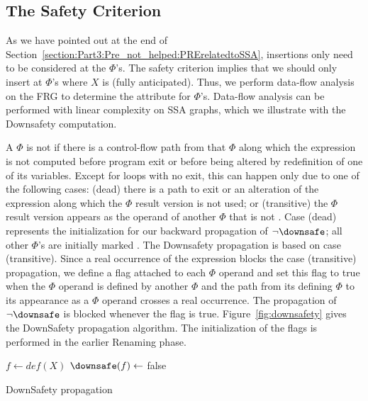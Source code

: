 \subsection{The Safety Criterion}

As we have pointed out at the end of Section~\ref{section:Part3:Pre_not_helped:PRErelatedtoSSA}, insertions only need to be considered at the $\Phi$'s. 
The safety criterion implies that we should only insert at $\Phi$'s where $X$ is \downsafe (fully anticipated). 
Thus, we perform data-flow analysis on the FRG to determine the \downsafe attribute for $\Phi$'s. 
Data-flow analysis can be performed with linear complexity on SSA graphs, which we illustrate with the Downsafety computation.

A $\Phi$ is not \downsafe{} if there is a control-flow path from that $\Phi$ along which the expression is not computed before program exit or before being altered by redefinition of one of its variables. 
Except for loops with no exit, this can happen only due to one of the following cases: 
(dead) there is a path to exit or an alteration of the expression along which the $\Phi$ result version is not used; 
or (transitive) the $\Phi$ result version appears as the operand of another $\Phi$ that is not \downsafe. 
Case (dead) represents the initialization for our backward propagation of $\neg \downsafe$; 
all other $\Phi$'s are initially marked \downsafe. 
The Downsafety propagation is based on case (transitive). 
Since a real occurrence of the expression blocks the case (transitive) propagation, we define a \hasrealuse flag attached to each $\Phi$ operand and set this flag to true when the $\Phi$ operand is defined by another $\Phi$ and the path from its defining $\Phi$ to its appearance as a $\Phi$ operand crosses a real occurrence. 
The propagation of $\neg \downsafe$ is blocked whenever the \hasrealuse flag is true. 
Figure~\ref{fig:downsafety} gives the DownSafety propagation algorithm. 
The initialization of the \hasrealuse flags is performed in the earlier Renaming phase.

\begin{algorithm}
  \LinesNumbered
{
}
\vspace{1em}
       {
  $f \gets def(X)$\;
  $\downsafe(f) \leftarrow$ false\;
}

\caption{DownSafety propagation}
\label{fig:downsafety}
\end{algorithm}

